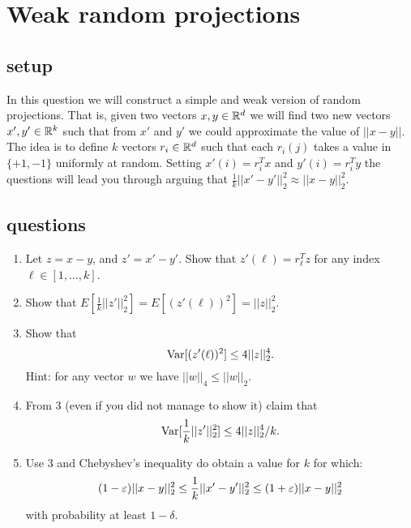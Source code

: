 \documentclass{article}
\begin{document}

\section{Weak random projections}
\subsection*{setup}
In this question we will construct a simple and weak version of
random projections. That is, given two vectors $x,y \in{\mathbb{R}}^{d}$ we
will find two new vectors $x',y'\in {\mathbb{R}}^{k}$ such that from $x'$ and
$y'$ we could approximate the value of $||x-y||$. The idea is to
define $k$ vectors $r_i \in {\mathbb{R}}^{d}$ such that each $r_i(j)$ takes a
value in $\{+1,-1\}$ uniformly at random. Setting $x'(i) =
r_{i}^{T}x$ and $y'(i) = r_{i}^{T}y$ the questions will lead you through arguing that
$\frac{1}{k}||x' -y'||_{2}^{2} \approx ||x-y||_{2}^{2}$.

\subsection*{questions}
\begin{enumerate}
\item Let $z = x-y$, and $z' = x' - y'$. Show that $z'(\ell) =
r_{\ell}^{T}z$ for any index $\ell \in [1,\ldots,k]$.

\item Show that $E[\frac{1}{k}||z'||_{2}^{2}] = E[(z'(\ell))^2] = ||z||_{2}^{2}$.
\item Show that
\[
{\operatorname{Var}}[(z'(\ell))^2] \le 4||z||_{2}^{4}.
\]
Hint: for any vector $w$ we have $||w||_4 \le ||w||_2$.
\item From 3 (even if you did not manage to show it) claim that
\[
{\operatorname{Var}}[\frac{1}{k}||z'||_{2}^{2}] \le 4||z||_{2}^{4}/k.
\]
\item Use 3 and Chebyshev's inequality do obtain a value for $k$
for which:
\[
(1-\varepsilon)||x-y||_{2}^{2} \le \frac{1}{k}||x' -y'||_{2}^{2} \le
(1+\varepsilon)||x-y||_{2}^{2}
\]
with probability at least $1-\delta$.
\end{enumerate}
\end{document}
